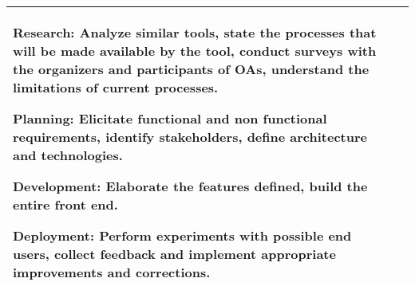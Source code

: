 \begin{table}[!htb]
\begin{tabular}{l|p{11cm}}
    \begin{inparaenum}[(i)]
      \item Research: Analyze similar tools, state the processes that will be made available by the tool, conduct surveys with the organizers and participants of \acp{OA}, understand the limitations of current processes.
      \item Planning: Elicitate functional and non functional requirements, identify stakeholders, define architecture and technologies.
      \item Development: Elaborate the features defined, build the entire front end.
      \item Deployment: Perform experiments with possible end users, collect feedback and implement appropriate improvements and corrections.
    \end{inparaenum}                                                                                                          \\
    \toprule
  \end{tabular}
\end{table}